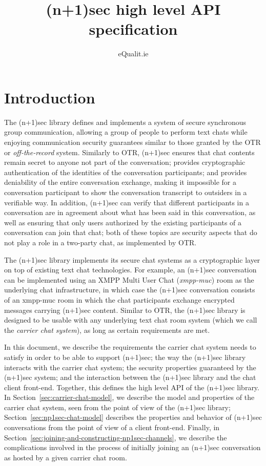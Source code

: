 \documentclass{article}
\title{(n+1)sec high level API specification}
\author{eQualit.ie}
\begin{document}
\maketitle

\section{Introduction}
\label{sec:introduction}

The (n+1)sec library defines and implements a system of secure synchronous group communication, allowing a group of people to perform text chats while enjoying communication security guarantees similar to those granted by the OTR or \emph{off-the-record} system.
Similarly to OTR, (n+1)sec ensures that chat contents remain secret to anyone not part of the conversation; provides cryptographic authentication of the identities of the conversation participants; and provides deniability of the entire conversation exchange, making it impossible for a conversation participant to show the conversation transcript to outsiders in a verifiable way.
In addition, (n+1)sec can verify that different participants in a conversation are in agreement about what has been said in this conversation, as well as ensuring that only users authorized by the existing participants of a conversation can join that chat; both of these topics are security aspects that do not play a role in a two-party chat, as implemented by OTR.

The (n+1)sec library implements its secure chat systems as a cryptographic layer on top of existing text chat technologies.
For example, an (n+1)sec conversation can be implemented using an XMPP Multi User Chat (\emph{xmpp-muc}) room as the underlying chat infrastructure, in which case the (n+1)sec conversation consists of an xmpp-muc room in which the chat participants exchange encrypted messages carrying (n+1)sec content.
Similar to OTR, the (n+1)sec library is designed to be usable with any underlying text chat room system (which we call the \emph{carrier chat system}), as long as certain requirements are met.

In this document, we describe the requirements the carrier chat system needs to satisfy in order to be able to support (n+1)sec; the way the (n+1)sec library interacts with the carrier chat system; the security properties guaranteed by the (n+1)sec system; and the interaction between the (n+1)sec library and the chat client front-end.
Together, this defines the high level API of the (n+1)sec library.
In Section~\ref{sec:carrier-chat-model}, we describe the model and properties of the carrier chat system, seen from the point of view of the (n+1)sec library; Section~\ref{sec:np1sec-chat-model} describes the properties and behavior of (n+1)sec conversations from the point of view of a client front-end.
Finally, in Section~\ref{sec:joining-and-constructing-np1sec-channels}, we describe the complications involved in the process of initially joining an (n+1)sec conversation as hosted by a given carrier chat room.
\end{document}
